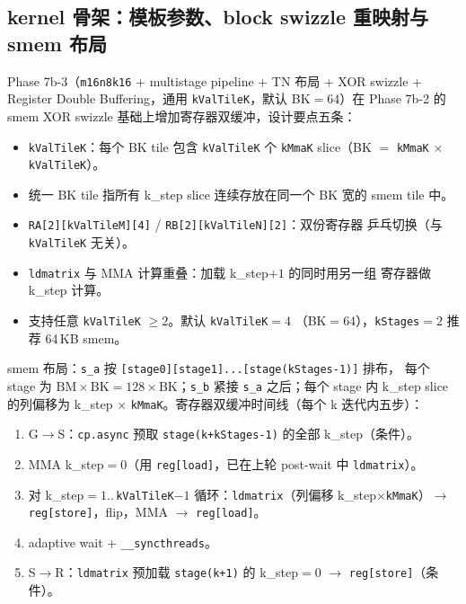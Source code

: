 \subsection{kernel 骨架：模板参数、block swizzle 重映射与 smem 布局}

Phase 7b-3（\texttt{m16n8k16} + multistage pipeline + TN 布局 + XOR swizzle +
Register Double Buffering，通用 \texttt{kValTileK}，默认 BK$=64$）在 Phase 7b-2
的 smem XOR swizzle 基础上增加寄存器双缓冲，设计要点五条：

\begin{itemize}
  \item \texttt{kValTileK}：每个 BK tile 包含 \texttt{kValTileK} 个 \texttt{kMmaK}
        slice（BK $=$ \texttt{kMmaK} $\times$ \texttt{kValTileK}）。
  \item 统一 BK tile 指所有 k\_step slice 连续存放在同一个 BK 宽的 smem tile 中。
  \item \texttt{RA[2][kValTileM][4]} / \texttt{RB[2][kValTileN][2]}：双份寄存器
        乒乓切换（与 \texttt{kValTileK} 无关）。
  \item \texttt{ldmatrix} 与 MMA 计算重叠：加载 k\_step$+1$ 的同时用另一组
        寄存器做 k\_step 计算。
  \item 支持任意 \texttt{kValTileK} $\ge 2$。默认 \texttt{kValTileK}$=4$
        （BK$=64$），\texttt{kStages}$=2$ 推荐 64\,KB smem。
\end{itemize}

smem 布局：\texttt{s\_a} 按 \texttt{[stage0][stage1]...[stage(kStages-1)]} 排布，
每个 stage 为 $\mathrm{BM} \times \mathrm{BK} = 128 \times \mathrm{BK}$；\texttt{s\_b}
紧接 \texttt{s\_a} 之后；每个 stage 内 k\_step slice 的列偏移为 k\_step $\times$
\texttt{kMmaK}。寄存器双缓冲时间线（每个 k 迭代内五步）：

\begin{enumerate}
  \item G$\to$S：\texttt{cp.async} 预取 \texttt{stage(k+kStages-1)} 的全部
        k\_step（条件）。
  \item MMA k\_step$=0$（用 \texttt{reg[load]}，已在上轮 post-wait 中
        \texttt{ldmatrix}）。
  \item 对 k\_step$=1..\,$\texttt{kValTileK}$-1$ 循环：\texttt{ldmatrix}（列偏移
        k\_step$\times$\texttt{kMmaK}）$\to$ \texttt{reg[store]}，flip，MMA $\to$
        \texttt{reg[load]}。
  \item adaptive wait + \texttt{\_\_syncthreads}。
  \item S$\to$R：\texttt{ldmatrix} 预加载 \texttt{stage(k+1)} 的 k\_step$=0$
        $\to$ \texttt{reg[store]}（条件）。
\end{enumerate}

